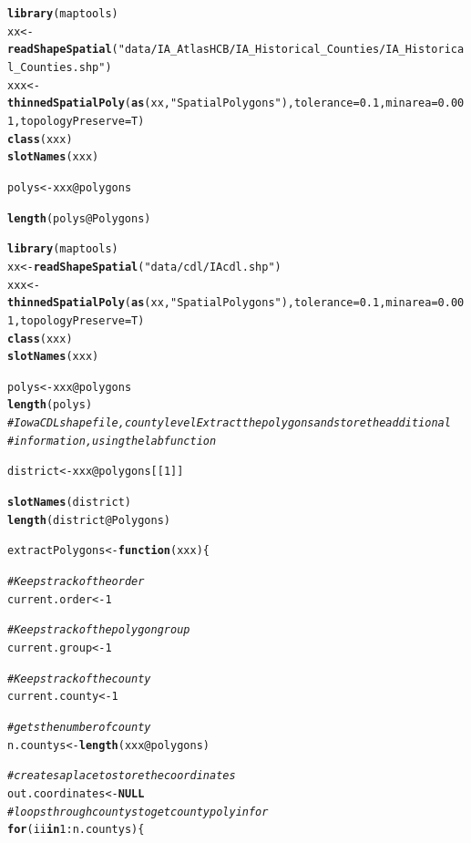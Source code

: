 \documentclass{article}\usepackage[]{graphicx}\usepackage[]{color}
\makeatletter
\newcommand{\hlnum}[1]{\textcolor[rgb]{0.686,0.059,0.569}{#1}}%
\newcommand{\hlstr}[1]{\textcolor[rgb]{0.192,0.494,0.8}{#1}}%
\newcommand{\hlcom}[1]{\textcolor[rgb]{0.678,0.584,0.686}{\textit{#1}}}%
\newcommand{\hlopt}[1]{\textcolor[rgb]{0,0,0}{#1}}%
\newcommand{\hlstd}[1]{\textcolor[rgb]{0.345,0.345,0.345}{#1}}%
\newcommand{\hlkwa}[1]{\textcolor[rgb]{0.161,0.373,0.58}{\textbf{#1}}}%
\newcommand{\hlkwb}[1]{\textcolor[rgb]{0.69,0.353,0.396}{#1}}%
\newcommand{\hlkwc}[1]{\textcolor[rgb]{0.333,0.667,0.333}{#1}}%
\newcommand{\hlkwd}[1]{\textcolor[rgb]{0.737,0.353,0.396}{\textbf{#1}}}%
\newenvironment{kframe}{%
 \def\at@end@of@kframe{}%
 \ifinner\ifhmode%
  \def\at@end@of@kframe{\end{minipage}}%
  \begin{minipage}{\columnwidth}%
 \fi\fi%
 \def\FrameCommand##1{\hskip\@totalleftmargin \hskip-\fboxsep
 \colorbox{shadecolor}{##1}\hskip-\fboxsep
     \hskip-\linewidth \hskip-\@totalleftmargin \hskip\columnwidth}%
 \MakeFramed {\advance\hsize-\width
   \@totalleftmargin\z@ \linewidth\hsize
   \@setminipage}}%
 {\par\unskip\endMakeFramed%
 \at@end@of@kframe}
\newenvironment{knitrout}{}{} %
\makeatother
\begin{document}
\begin{itemize}
\begin{knitrout}
\begin{kframe}
\begin{alltt}
\hlkwd{library}\hlstd{(maptools)}
\hlstd{xx} \hlkwb{<-} \hlkwd{readShapeSpatial}\hlstd{(}\hlstr{"data/IA_AtlasHCB/IA_Historical_Counties/IA_Historical_Counties.shp"}\hlstd{)}
\hlstd{xxx} \hlkwb{<-} \hlkwd{thinnedSpatialPoly}\hlstd{(}\hlkwd{as}\hlstd{(xx,} \hlstr{"SpatialPolygons"}\hlstd{),} \hlkwc{tolerance} \hlstd{=} \hlnum{0.1}\hlstd{,} \hlkwc{minarea} \hlstd{=} \hlnum{0.001}\hlstd{,} \hlkwc{topologyPreserve} \hlstd{= T)}
\hlkwd{class}\hlstd{(xxx)}
\hlkwd{slotNames}\hlstd{(xxx)}

\hlstd{polys} \hlkwb{<-} \hlstd{xxx}\hlopt{@}\hlkwc{polygons}

\hlkwd{length}\hlstd{(polys}\hlopt{@}\hlkwc{Polygons}\hlstd{)}




\hlkwd{library}\hlstd{(maptools)}
\hlstd{xx} \hlkwb{<-} \hlkwd{readShapeSpatial}\hlstd{(}\hlstr{"data/cdl/IAcdl.shp"}\hlstd{)}
\hlstd{xxx} \hlkwb{<-} \hlkwd{thinnedSpatialPoly}\hlstd{(}\hlkwd{as}\hlstd{(xx,} \hlstr{"SpatialPolygons"}\hlstd{),} \hlkwc{tolerance} \hlstd{=} \hlnum{0.1}\hlstd{,} \hlkwc{minarea} \hlstd{=} \hlnum{0.001}\hlstd{,} \hlkwc{topologyPreserve} \hlstd{= T)}
\hlkwd{class}\hlstd{(xxx)}
\hlkwd{slotNames}\hlstd{(xxx)}

\hlstd{polys} \hlkwb{<-} \hlstd{xxx}\hlopt{@}\hlkwc{polygons}
\hlkwd{length}\hlstd{(polys)}
\hlcom{# Iowa CDL shapefile, county level Extract the polygons and store the additional}
\hlcom{# information , using the lab function}

\hlstd{district} \hlkwb{<-} \hlstd{xxx}\hlopt{@}\hlkwc{polygons}\hlstd{[[}\hlnum{1}\hlstd{]]}

\hlkwd{slotNames}\hlstd{(district)}
\hlkwd{length}\hlstd{(district}\hlopt{@}\hlkwc{Polygons}\hlstd{)}


\hlstd{extractPolygons} \hlkwb{<-} \hlkwa{function}\hlstd{(}\hlkwc{xxx}\hlstd{) \{}

    \hlcom{# Keeps track of the order}
    \hlstd{current.order} \hlkwb{<-} \hlnum{1}

    \hlcom{# Keeps track of the polygon group}
    \hlstd{current.group} \hlkwb{<-} \hlnum{1}

    \hlcom{# Keeps track of the county}
    \hlstd{current.county} \hlkwb{<-} \hlnum{1}

    \hlcom{# gets the number of county}
    \hlstd{n.countys} \hlkwb{<-} \hlkwd{length}\hlstd{(xxx}\hlopt{@}\hlkwc{polygons}\hlstd{)}

    \hlcom{# creates a place to store the coordinates}
    \hlstd{out.coordinates} \hlkwb{<-} \hlkwa{NULL}
    \hlcom{# loops through countys to get county poly infor}
    \hlkwa{for} \hlstd{(ii} \hlkwa{in} \hlnum{1}\hlopt{:}\hlstd{n.countys) \{}


\end{alltt}
\end{kframe}
\end{knitrout}
\end{itemize}
\end{document}
